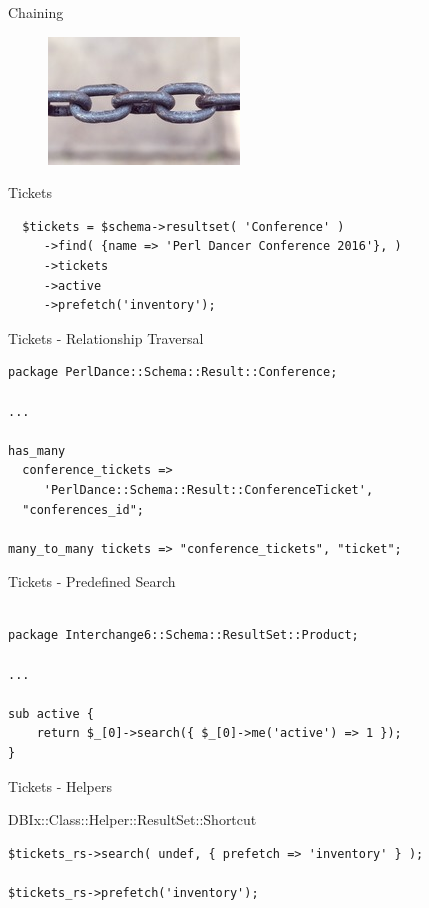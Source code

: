 \begin{frame}{Chaining}
  \begin{figure}[!ht]
    \begin{center}
      \includegraphics{img/chains.jpg}
    \end{center}
  \end{figure}
\end{frame}

\begin{frame}[fragile]{Tickets}

\begin{lstlisting}
  $tickets = $schema->resultset( 'Conference' )
     ->find( {name => 'Perl Dancer Conference 2016'}, )
     ->tickets
     ->active
     ->prefetch('inventory');
\end{lstlisting}
\end{frame}

\begin{frame}[fragile]{Tickets - Relationship Traversal}
\begin{lstlisting}
package PerlDance::Schema::Result::Conference;

...

has_many
  conference_tickets =>
     'PerlDance::Schema::Result::ConferenceTicket',
  "conferences_id";

many_to_many tickets => "conference_tickets", "ticket";

\end{lstlisting}
\end{frame}

\begin{frame}[fragile]{Tickets - Predefined Search}
\begin{lstlisting}

package Interchange6::Schema::ResultSet::Product;

...

sub active {
    return $_[0]->search({ $_[0]->me('active') => 1 });
}

\end{lstlisting}
\end{frame}

\begin{frame}[fragile]{Tickets - Helpers}

DBIx::Class::Helper::ResultSet::Shortcut

\begin{lstlisting}
$tickets_rs->search( undef, { prefetch => 'inventory' } );

$tickets_rs->prefetch('inventory');
\end{lstlisting}
\end{frame}

